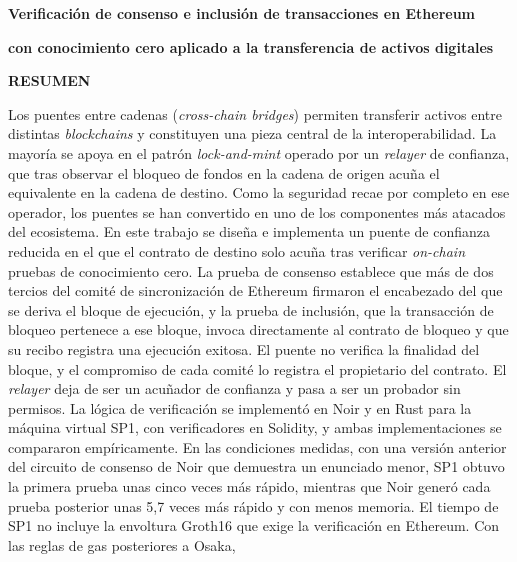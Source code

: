 \centerline{\textbf{\large Verificación de consenso e inclusión de transacciones en Ethereum}}
\centerline{\textbf{\large con conocimiento cero aplicado a la transferencia de activos digitales}}

\vspace{1cm}

\vspace{0.3cm}

\vspace{0.3cm}

\noindent
\textbf{RESUMEN}

\vspace{0.3cm}

\noindent
Los puentes entre cadenas (\textit{cross-chain bridges}) permiten transferir activos entre
distintas \textit{blockchains} y constituyen una pieza central de la interoperabilidad. La mayoría
se apoya en el patrón \textit{lock-and-mint} operado por un \textit{relayer} de confianza, que tras
observar el bloqueo de fondos en la cadena de origen acuña el equivalente en la cadena de destino.
Como la seguridad recae por completo en ese operador, los puentes se han convertido en uno de los
componentes más atacados del ecosistema. En este trabajo se diseña e implementa un puente de
confianza reducida en el que el contrato de destino solo acuña tras verificar \textit{on-chain}
pruebas de conocimiento cero. La prueba de consenso establece que más de dos tercios del comité
de sincronización de Ethereum firmaron el encabezado del que se deriva el bloque de ejecución, y la
prueba de inclusión, que la transacción de bloqueo pertenece a ese bloque, invoca directamente al
contrato de bloqueo y que su recibo registra una ejecución exitosa. El puente no verifica la
finalidad del bloque, y el compromiso de cada comité lo registra el propietario del contrato. El
\textit{relayer} deja de ser un acuñador de confianza y pasa a ser un probador sin permisos. La
lógica de verificación se implementó en Noir y en Rust para la máquina virtual SP1, con
verificadores en Solidity, y ambas implementaciones se compararon empíricamente. En las
condiciones medidas, con una versión anterior del circuito de consenso de Noir que demuestra un
enunciado menor, SP1 obtuvo la primera prueba unas cinco veces más rápido, mientras que Noir generó
cada prueba posterior unas 5,7 veces más rápido y con menos memoria. El tiempo de SP1 no incluye la
envoltura Groth16 que exige la verificación en Ethereum. Con las reglas de gas posteriores a Osaka,
